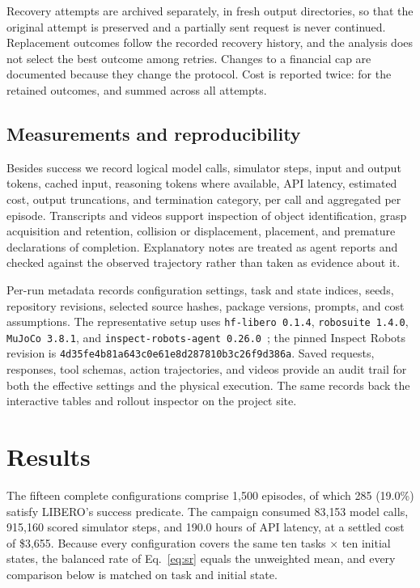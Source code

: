 \documentclass[11pt]{article}
\begin{document}
Recovery attempts are archived separately, in fresh output directories, so that
the original attempt is preserved and a partially sent request is never
continued. Replacement outcomes follow the recorded recovery history, and the
analysis does not select the best outcome among retries. Changes to a financial
cap are documented because they change the protocol. Cost is reported twice:
for the retained outcomes, and summed across all attempts.

\subsection{Measurements and reproducibility}
Besides success we record logical model calls, simulator steps, input and
output tokens, cached input, reasoning tokens where available, API latency,
estimated cost, output truncations, and termination category, per call and
aggregated per episode. Transcripts and videos support inspection of object
identification, grasp acquisition and retention, collision or displacement,
placement, and premature declarations of completion. Explanatory notes are
treated as agent reports and checked against the observed trajectory rather
than taken as evidence about it.

Per-run metadata records configuration settings, task and state indices, seeds,
repository revisions, selected source hashes, package versions, prompts, and
cost assumptions. The representative setup uses \texttt{hf-libero 0.1.4},
\texttt{robosuite 1.4.0}, \texttt{MuJoCo 3.8.1}, and
\texttt{inspect-robots-agent 0.26.0}~\citep{inspectrobots}; the pinned
Inspect Robots revision is
\texttt{4d35fe4b81a643c0e61e8d287810b3c26f9d386a}. Saved requests, responses,
tool schemas, action trajectories, and videos provide an audit trail for both
the effective settings and the physical execution. The same records back the
interactive tables and rollout inspector on the project site.

\section{Results}
\label{sec:results}
The fifteen complete configurations comprise 1,500 episodes, of which 285
(19.0\%) satisfy LIBERO's success predicate. The campaign consumed 83{,}153
model calls, 915{,}160 scored simulator steps, and 190.0 hours of API latency,
at a settled cost of \$3{,}655. Because every configuration covers the same
ten tasks $\times$ ten initial states, the balanced rate of
Eq.~\eqref{eq:sr} equals the unweighted mean, and every comparison below is
matched on task and initial state.
\end{document}
